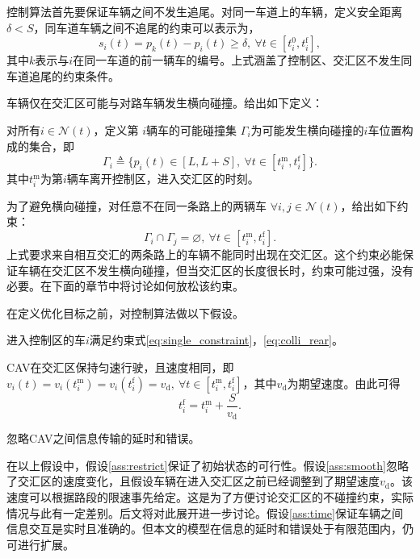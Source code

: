 控制算法首先要保证车辆之间不发生追尾。对同一车道上的车辆，定义安全距离$\delta < S$，同车道车辆之间不追尾的约束可以表示为，
\begin{equation}
s_i(t)=p_k(t)-p_i(t)\geq \delta, \ \forall t\in [t_i^0, t_i^\mathrm{f}],
\label{eq:colli_rear}
\end{equation}
其中$k$表示与$i$在同一车道的前一辆车的编号。上式涵盖了控制区、交汇区不发生同车道追尾的约束条件。

车辆仅在交汇区可能与对路车辆发生横向碰撞。给出如下定义：
\begin{definition}[可能碰撞集]
对所有$i\in \mathcal{N}(t)$，定义第 $i$辆车的{\heiti 可能碰撞集} $\Gamma_i$为可能发生横向碰撞的$i$车位置构成的集合，即
\begin{equation}
\Gamma_i\triangleq \{p_i(t)\in[L,L+S],\  \forall t\in [t_i^\mathrm{m},t_i^\mathrm{f}]\}.
\end{equation}
其中$t_i^\mathrm{m}$为第$i$辆车离开控制区，进入交汇区的时刻。
\end{definition}
为了避免横向碰撞，对任意不在同一条路上的两辆车 $\forall i,j\in \mathcal{N}(t)$，给出如下约束：
\begin{equation}
\Gamma_i\cap \Gamma_j=\varnothing, \ \forall t\in [t_i^\mathrm{m},t_i^\mathrm{f}].
\label{eq:colli_lateral}
\end{equation}
上式要求来自相互交汇的两条路上的车辆不能同时出现在交汇区。这个约束必能保证车辆在交汇区不发生横向碰撞，但当交汇区的长度很长时，约束可能过强，没有必要。在下面的章节中将讨论如何放松该约束。

在定义优化目标之前，对控制算法做以下假设。
\begin{assumption}
进入控制区的车$i$满足约束式\ref{eq:single_constraint}，\ref{eq:colli_rear}。
\label{ass:restrict}
\end{assumption}
\begin{assumption}
CAV在交汇区保持匀速行驶，且速度相同，即$v_i(t) = v_i(t_i^\mathrm{m}) = v_i(t_i^\mathrm{f}) = v_\mathrm{d}, \ \forall t\in [t_i^\mathrm{m},t_i^\mathrm{f}]$，其中$v_\mathrm{d}$为期望速度。由此可得
\begin{equation}
t_i^\mathrm{f}=t_i^\mathrm{m} + \frac{S}{v_\mathrm{d}}.
\end{equation}
\label{ass:smooth}
\end{assumption}
\begin{assumption}
忽略CAV之间信息传输的延时和错误。
\label{ass:time}
\end{assumption}

在以上假设中，假设\ref{ass:restrict}保证了初始状态的可行性。假设\ref{ass:smooth}忽略了交汇区的速度变化，且假设车辆在进入交汇区之前已经调整到了期望速度$v_\mathrm{d}$。该速度可以根据路段的限速事先给定。这是为了方便讨论交汇区的不碰撞约束，实际情况与此有一定差别。后文将对此展开进一步讨论。假设\ref{ass:time}保证车辆之间信息交互是实时且准确的。但本文的模型在信息的延时和错误处于有限范围内，仍可进行扩展。

